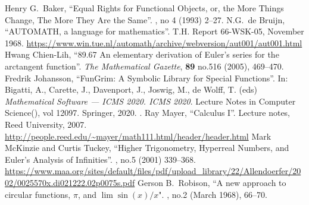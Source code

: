 \begin{thebibliography}{99}\setlength{\parskip}{0pt}
  \setlength{\itemsep}{0pt plus 0.3ex}%
{}
  Henry G.~Baker,
  ``Equal Rights for Functional Objects, or, the More Things Change, The More They Are the Same''.
   , no 4 (1993)
  2--27.\newline
  {\tt{}}
  N.G.~de Bruijn,
  ``AUTOMATH, a language for mathematics''.
  T.H. Report 66-WSK-05, November 1968.\newline
  \url{https://www.win.tue.nl/automath/archive/webversion/aut001/aut001.html}
  Hwang Chien-Lih,
  ``89.67 An elementary derivation of Euler's series for the arctangent function''.
  \textit{The Mathematical Gazette}, \textbf{89} no.516 (2005), 469--470.
  {\tt{}}
  Fredrik Johansson,
  ``FunGrim: A Symbolic Library for Special Functions''.
  In: Bigatti, A., Carette, J., Davenport, J., Joswig, M., de Wolff, T.
  (eds)
  \textit{Mathematical Software --- ICMS 2020. ICMS 2020}.
  Lecture Notes in Computer Science(), vol 12097. Springer, 2020.\newline
  {\tt{}}.
  Ray Mayer,
  ``Calculus I''.
  Lecture notes, Reed University, 2007.\newline
  \url{http://people.reed.edu/~mayer/math111.html/header/header.html}
 Mark McKinzie and Curtis Tuckey,
  ``Higher Trigonometry, Hyperreal Numbers, and Euler's Analysis of Infinities''.
   , no.5 (2001) 339--368.\newline
\url{https://www.maa.org/sites/default/files/pdf/upload_library/22/Allendoerfer/2002/0025570x.di021222.02p0075s.pdf}
 Gerson B.~Robison,
  ``A new approach to circular functions, $\pi$, and $\lim\sin(x)/x$".
   , no.2 (March 1968), 66--70.\newline
{\tt{}}
\end{thebibliography}
